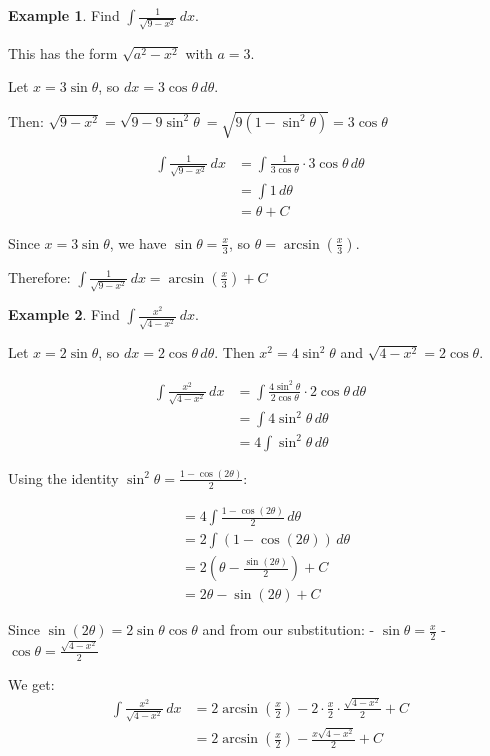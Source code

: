 \documentclass[12pt,a4paper]{book}
\theoremstyle{definition}
\newtheorem{example}{Example}[chapter]
\begin{document}
\begin{example}
Find $\int \frac{1}{\sqrt{9 - x^2}} \, dx$.

This has the form $\sqrt{a^2 - x^2}$ with $a = 3$.

Let $x = 3\sin\theta$, so $dx = 3\cos\theta \, d\theta$.

Then: $\sqrt{9 - x^2} = \sqrt{9 - 9\sin^2\theta} = \sqrt{9(1 - \sin^2\theta)} = 3\cos\theta$

\begin{align}
\int \frac{1}{\sqrt{9 - x^2}} \, dx &= \int \frac{1}{3\cos\theta} \cdot 3\cos\theta \, d\theta\\
&= \int 1 \, d\theta\\
&= \theta + C
\end{align}

Since $x = 3\sin\theta$, we have $\sin\theta = \frac{x}{3}$, so $\theta = \arcsin\left(\frac{x}{3}\right)$.

Therefore: $\int \frac{1}{\sqrt{9 - x^2}} \, dx = \arcsin\left(\frac{x}{3}\right) + C$
\end{example}

\begin{example}
Find $\int \frac{x^2}{\sqrt{4 - x^2}} \, dx$.

Let $x = 2\sin\theta$, so $dx = 2\cos\theta \, d\theta$.
Then $x^2 = 4\sin^2\theta$ and $\sqrt{4 - x^2} = 2\cos\theta$.

\begin{align}
\int \frac{x^2}{\sqrt{4 - x^2}} \, dx &= \int \frac{4\sin^2\theta}{2\cos\theta} \cdot 2\cos\theta \, d\theta\\
&= \int 4\sin^2\theta \, d\theta\\
&= 4\int \sin^2\theta \, d\theta
\end{align}

Using the identity $\sin^2\theta = \frac{1 - \cos(2\theta)}{2}$:

\begin{align}
&= 4\int \frac{1 - \cos(2\theta)}{2} \, d\theta\\
&= 2\int (1 - \cos(2\theta)) \, d\theta\\
&= 2\left(\theta - \frac{\sin(2\theta)}{2}\right) + C\\
&= 2\theta - \sin(2\theta) + C
\end{align}

Since $\sin(2\theta) = 2\sin\theta\cos\theta$ and from our substitution:
- $\sin\theta = \frac{x}{2}$
- $\cos\theta = \frac{\sqrt{4-x^2}}{2}$

We get:
\begin{align}
\int \frac{x^2}{\sqrt{4 - x^2}} \, dx &= 2\arcsin\left(\frac{x}{2}\right) - 2 \cdot \frac{x}{2} \cdot \frac{\sqrt{4-x^2}}{2} + C\\
&= 2\arcsin\left(\frac{x}{2}\right) - \frac{x\sqrt{4-x^2}}{2} + C
\end{align}
\end{example}
\end{document}
